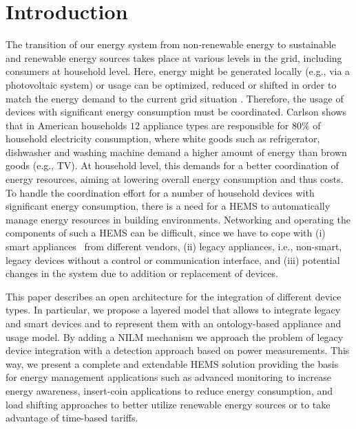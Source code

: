 \documentclass{article}
\begin{document}
\section{Introduction}

The transition of our energy system from non-renewable energy to sustainable and renewable energy sources takes place at various levels in the grid, including consumers at household level.
Here, energy might be generated locally (e.g., via a photovoltaic system) or usage can be optimized, reduced or shifted in order to match the energy demand to the current grid situation \cite{Palensky2011}.
Therefore, the usage of devices with significant energy consumption must be coordinated.
Carlson \cite{Carlson2013132} shows that in American households $12$ appliance types are responsible for $80\%$ of household electricity consumption, where white goods such as refrigerator, dishwasher and washing machine demand a higher amount of energy than brown goods (e.g., TV).
At household level, this demands for a better coordination of energy resources, aiming at lowering overall energy consumption and thus costs.
To handle the coordination effort for a number of household devices with significant energy consumption, there is a need for a \acf{HEMS} to automatically manage energy resources in building environments.
Networking and operating the components of such a \ac{HEMS} can be difficult, since we have to cope with (i) smart appliances~\cite{elmenreich:wises12} from different vendors, (ii) legacy appliances,
i.e., non-smart, legacy devices without a control or communication interface, and (iii) potential changes in the system due to addition or replacement of devices.

This paper describes an open architecture for the integration of different device types. In particular, we propose a layered model that allows to integrate legacy and smart devices and to represent them with an ontology-based appliance and usage model. By adding a \ac{NILM} mechanism we approach the problem of legacy device integration with a detection approach based on power measurements.
This way, we present a complete and extendable \ac{HEMS} solution providing the basis for energy management applications such as advanced monitoring to increase energy awareness, insert-coin applications to reduce energy consumption, and load shifting approaches to better utilize renewable energy sources or to take advantage of time-based tariffs.
\end{document}
